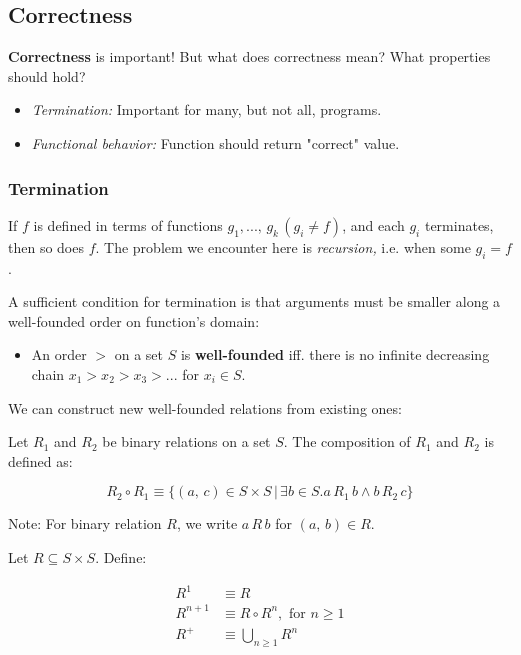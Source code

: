 \documentclass[a4paper]{extarticle}
\begin{document}
\subsection{Correctness}

\textbf{Correctness} is important! But what does correctness mean? What properties should hold?

\begin{itemize}
    \item \textit{Termination:} Important for many, but not all, programs.
    \item \textit{Functional behavior:} Function should return "correct" value.
\end{itemize}

\subsubsection{Termination}

If \(f\) is defined in terms of functions \(g_1,..., \, g_k \, (g_i \neq f)\), and each \(g_i\) terminates, then so does \(f\). The problem we encounter here is \textit{recursion,} i.e. when some \(g_i = f\).

A sufficient condition for termination is that arguments must be smaller along a well-founded order on function's domain:

\begin{itemize}
    \item An order \(>\) on a set \(S\) is \textbf{well-founded} iff. there is no infinite decreasing chain \(x_1 > x_2 > x_3 > ...\) for \(x_i \in S\).
\end{itemize}

We can construct new well-founded relations from existing ones:

Let \(R_1\) and \(R_2\) be binary relations on a set \(S\). The composition of \(R_1\) and \(R_2\) is defined as:

\[
    R_2 \circ R_1 \equiv \{(a, \, c) \in S \times S \, | \, \exists b \in S.a \, R_1 \, b \land b \, R_2 \, c\}
\]

Note: For binary relation \(R\), we write \(a \, R \, b\) for \((a, \, b) \in R\).

Let \(R \subseteq S \times S\). Define:

\begin{align*}
    R^1 &\equiv R \\
    R^{n + 1} &\equiv R \circ R^n, \text{ for } n \geq 1 \\
    R^+ &\equiv \bigcup_{n \geq 1} R^n
\end{align*}
\end{document}

